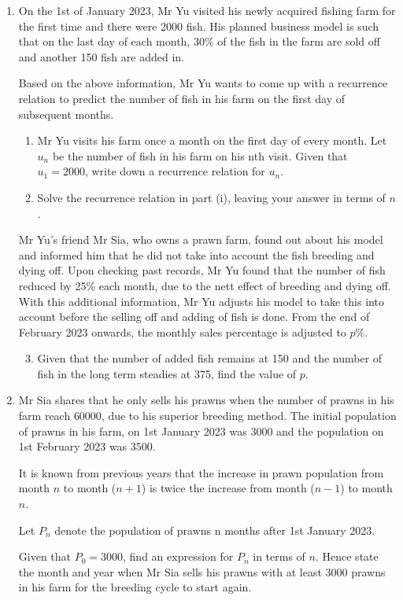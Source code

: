 \documentclass{echw}
\begin{document}
    \problem{}
        \begin{enumerate}
            \item On the 1st of January 2023, Mr Yu visited his newly acquired fishing farm for the first time and there were 2000 fish. His planned business model is such that on the last day of
            each month, 30\% of the fish in the farm are sold off and another 150 fish are added in.

            Based on the above information, Mr Yu wants to come up with a recurrence relation to predict the number of fish in his farm on the first day of subsequent months.

            \begin{enumerate}
                \item Mr Yu visits his farm once a month on the first day of every month. Let $u_n$ be the number of fish in his farm on his nth visit. Given that $u_1 = 2000$, write down a recurrence relation for $u_n$.
                \item Solve the recurrence relation in part (i), leaving your answer in terms of $n$.
            \end{enumerate}

            Mr Yu's friend Mr Sia, who owns a prawn farm, found out about his model and informed him that he did not take into account the fish breeding and dying off. Upon checking past records, Mr Yu found that the number of fish reduced by 25\% each month, due to the nett effect of breeding and dying off. With this additional information, Mr Yu adjusts his model to take this into account before the selling off and adding of fish is done. From the end of February 2023 onwards, the monthly sales percentage is adjusted to $p$\%.

            \begin{enumerate}
                \setcounter{enumii}{2}
                \item Given that the number of added fish remains at 150 and the number of fish in the long term steadies at 375, find the value of $p$.
            \end{enumerate}

            \item Mr Sia shares that he only sells his prawns when the number of prawns in his farm reach $60000$, due to his superior breeding method. The initial population of prawns in his farm, on 1st January 2023 was 3000 and the population on 1st February 2023 was 3500.
            
            It is known from previous years that the increase in prawn population from month $n$ to month ($n+1$) is twice the increase from month ($n-1$) to month $n$.

            Let $P_n$ denote the population of prawns n months after 1st January 2023.

            Given that $P_0 = 3000$, find an expression for $P_n$ in terms of $n$. Hence state the month and year when Mr Sia sells his prawns with at least 3000 prawns in his farm for the breeding cycle to start again.
        \end{enumerate}
\end{document}
